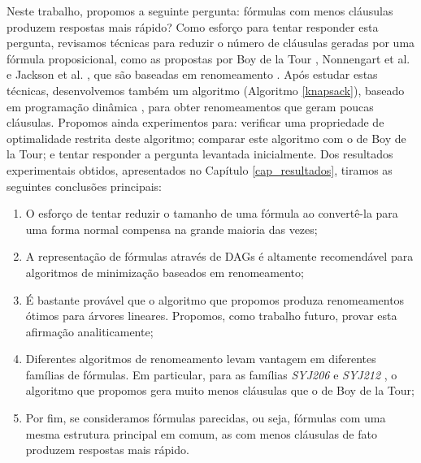 
\label{cap_conclusoes}

\indent

Neste trabalho, propomos a seguinte pergunta: fórmulas com menos cláusulas produzem respostas mais rápido? Como esforço para tentar responder esta pergunta, revisamos técnicas para reduzir o número de cláusulas geradas por uma fórmula proposicional, como as propostas por Boy de la Tour \cite{de1992optimality}, Nonnengart et al. \cite{nonnengart2001computing} e Jackson et al. \cite{jackson2004clause}, que são baseadas em renomeamento \cite{plaisted1986structure}. Após estudar estas técnicas, desenvolvemos também um algoritmo (Algoritmo \ref{knapsack}), baseado em programação dinâmica \cite{bellman2015applied}, para obter renomeamentos que geram poucas cláusulas. Propomos ainda experimentos para: verificar uma propriedade de optimalidade restrita deste algoritmo; comparar este algoritmo com o de Boy de la Tour; e tentar responder a pergunta levantada inicialmente. Dos resultados experimentais obtidos, apresentados no Capítulo \ref{cap_resultados}, tiramos as seguintes conclusões principais:
\begin{enumerate}
	\item O esforço de tentar reduzir o tamanho de uma fórmula ao convertê-la para uma forma normal compensa na grande maioria das vezes;
	\item A representação de fórmulas através de DAGs é altamente recomendável para algoritmos de minimização baseados em renomeamento;
	\item É bastante provável que o algoritmo que propomos produza renomeamentos ótimos para árvores lineares. Propomos, como trabalho futuro, provar esta afirmação analiticamente;
	\item Diferentes algoritmos de renomeamento levam vantagem em diferentes famílias de fórmulas. Em particular, para as famílias \emph{SYJ206} e \emph{SYJ212} \cite{raths07jar}, o algoritmo que propomos gera muito menos cláusulas que o de Boy de la Tour;
	\item Por fim, se consideramos fórmulas parecidas, ou seja, fórmulas com uma mesma estrutura principal em comum, as com menos cláusulas de fato produzem respostas mais rápido.
\end{enumerate}

